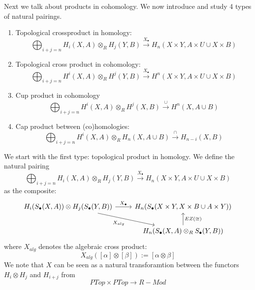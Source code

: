 Next we talk about products in cohomology. We now introduce and study 4 types of natural pairings.
\begin{enumerate}
    \item Topological crossproduct in homology:
    \begin{equation*}
        \bigoplus_{i+j=n}H_i(X,A)\otimes_R H_j(Y,B)\xrightarrow{X_\bullet}H_n(X\times Y, A\times U\cup X\times B)
    \end{equation*}
    \item Topological cross product in cohomology:
    \begin{equation*}
        \bigoplus_{i+j=n}H^i(X,A)\otimes_R H^j(Y,B)\xrightarrow{X_\bullet}H^n(X\times Y, A\times U\cup X\times B)
    \end{equation*}
    \item Cup product in cohomology 
    \begin{equation*}
        \bigoplus_{i+j=n}H^i(X,A)\otimes_R H^j(X,B)\xrightarrow{\cup} H^n(X,A\cup B)
    \end{equation*}
    \item Cap product between (co)homologies:
    \begin{equation*}
        \bigoplus_{i+j=n}H^i(X,A)\otimes_R H_n(X,A\cup B)\xrightarrow{\cap} H_{n-i}(X,B)
    \end{equation*}
\end{enumerate}

We start with the first type: topological product in homology. We define the natural pairing
\begin{equation*}
    \bigoplus_{i+j=n}H_i(X,A)\otimes_R H_j(Y,B)\xrightarrow{X_\bullet}H_n(X\times Y, A\times U\cup X\times B)
\end{equation*}
as the composite:
\[\begin{tikzcd}
	{H_i(S_\bullet(X,A))\otimes H_j(S_\bullet(Y,B))} & {H_n(S_\bullet(X\times Y, X\times B\cup A\times Y))} \\
	& {H_n(S_\bullet(X,A)\otimes_R S_\bullet(Y,B))}
	\arrow["{X_\bullet}", from=1-1, to=1-2]
	\arrow["{X_{alg}}"', from=1-1, to=2-2]
	\arrow["{EZ(\cong)}"', from=2-2, to=1-2]
\end{tikzcd}\]
where $X_{alg}$ denotes the algebraic cross product:
\begin{equation*}
    X_{alg}([\alpha]\otimes[\beta]):=[\alpha\otimes\beta]
\end{equation*}
We note that $X$ can be seen as a natural transforamtion between the functors $H_i\otimes H_j$ and $H_{i+j}$ from 
\begin{equation*}
    PTop\times PTop\to R-Mod
\end{equation*}

